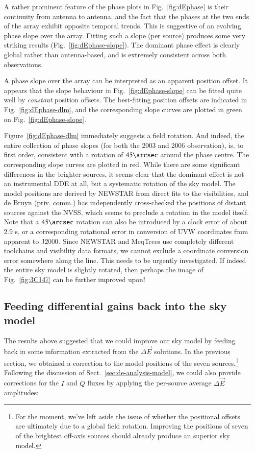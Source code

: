 \documentclass[]{aa}
\newcommand{\jones}[2]{\vec {#1}_{#2}}
\begin{document}
A rather prominent feature of the phase plots in Fig.~\ref{fig:dEphase} is their continuity from antenna to antenna, and the fact that the phases at the two ends of the array exhibit opposite temporal trends. This is suggestive of an evolving phase slope over the array. Fitting such a slope (per source) produces some very striking results (Fig.~\ref{fig:dEphase-slope}). The dominant phase effect is clearly global rather than antenna-based, and is extremely consistent across both observations.

A phase slope over the array can be interpreted as an apparent position offset. It appears that the slope behaviour in Fig.~\ref{fig:dEphase-slope} can be fitted quite well by \emph{constant} position offsets. 
The best-fitting position offsets are indicated in Fig.~\ref{fig:dEphase-dlm}, and the corresponding slope curves are plotted in green on Fig.~\ref{fig:dEphase-slope}. 

Figure~\ref{fig:dEphase-dlm} immediately suggests a field rotation. And indeed, the entire collection of phase slopes (for both the 2003 and 2006 observation), is, to first order, consistent with a rotation of $45\arcsec$ around the phase centre. The corresponding slope curves are plotted in red. While there are some significant differences in the brighter sources, it seems clear that the dominant effect is not an instrumental DDE at all, but a systematic rotation of the sky model. The model positions are derived by NEWSTAR from direct fits to the visibilities, and de Bruyn (priv. comm.) has independently cross-checked the positions of distant sources against the NVSS, which seems to preclude a rotation in the model itself. Note that a $45\arcsec$ rotation can also be introduced by a clock error of about 2.9 s, or a corresponding rotational error in conversion of UVW coordinates from apparent to J2000. Since NEWSTAR and MeqTrees use completely different toolchains and visibility data formats, we cannot exclude a coordinate conversion error somewhere along the line. This needs to be urgently investigated. If indeed the entire sky model is slightly rotated, then perhaps the image of Fig.~\ref{fig:3C147} can be further improved upon!

\subsection{Feeding differential gains back into the sky model\label{sec:model-improvement}}

The results above suggested that we could improve our sky model by feeding back in some information extracted from the $\Delta\jones{E}{}$ solutions. In the previous section, we obtained a correction to the model positions of the seven sources.\footnote{For the moment, we've left aside the issue of whether the positional offsets are ultimately due to a global field rotation. Improving the positions of seven of the brightest off-axis sources should already produce an superior sky model.} Following the discussion of Sect.~\ref{sec:de-analysis-model}, we could also provide corrections for the $I$ and $Q$ fluxes by applying the per-source average $\Delta\jones{E}{}$ amplitudes:
\end{document}
